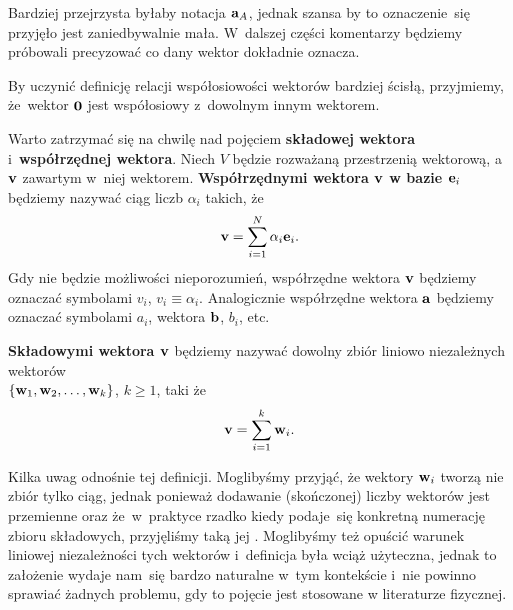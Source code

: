 \documentclass[a4paper,11pt]{article}
\numberwithin{equation}{section}
\begin{document}
Bardziej przejrzysta byłaby notacja $\mathbf{a}_{ A }$, jednak szansa by to
oznaczenie~się przyjęło jest zaniedbywalnie mała. W~dalszej części
komentarzy będziemy próbowali precyzować co dany wektor dokładnie oznacza.

\VerSpaceFour




\noindent
{} By uczynić definicję relacji współosiowości wektorów bardziej
ścisłą, przyjmiemy, że~wektor $\mathbf{0}$ jest współosiowy z~dowolnym
innym wektorem.

\VerSpaceFour





\noindent
{} Warto zatrzymać się na chwilę nad pojęciem \textbf{składowej
  wektora} i~\textbf{współrzędnej wektora}. Niech $V$ będzie rozważaną
przestrzenią wektorową, a~$\mathbf{v}$ zawartym w~niej wektorem.
\textbf{Współrzędnymi wektora $\mathbf{v}$ w bazie $\mathbf{e}_{ i }$}
będziemy nazywać ciąg liczb $\alpha_{ i }$ takich, że
\begin{equation}
  \label{eq:SkalmierskiMechanika-01}
  \mathbf{v} = \sum_{ i = 1 }^{ N } \alpha_{ i } \mathbf{e}_{ i }.
\end{equation}
Gdy nie będzie możliwości nieporozumień, współrzędne wektora $\mathbf{v}$
będziemy oznaczać symbolami $v_{ i }$, $v_{ i } \equiv \alpha_{ i }$. Analogicznie
współrzędne wektora $\mathbf{a}$ będziemy oznaczać symbolami $a_{ i }$,
wektora $\mathbf{b}$, $b_{ i }$, etc.

\textbf{Składowymi wektora $\mathbf{v}$} będziemy nazywać dowolny zbiór
liniowo niezależnych wektorów \\
$\{ \mathbf{w}_{ 1 }, \mathbf{w}_{ 2 }, \ldots, \mathbf{w}_{ k } \}$, $k \geq 1$, taki że
\begin{equation}
  \label{eq:SkalmierskiMechanika-02}
  \mathbf{v} = \sum_{ i = 1 }^{ k } \mathbf{w}_{ i }.
\end{equation}

Kilka uwag odnośnie tej definicji. Moglibyśmy przyjąć, że wektory
$\mathbf{w}_{ i }$ tworzą nie zbiór tylko ciąg, jednak ponieważ dodawanie
(skończonej) liczby wektorów jest przemienne oraz że~w~praktyce rzadko
kiedy podaje~się konkretną numerację zbioru składowych, przyjęliśmy taką
jej . Moglibyśmy też opuścić warunek liniowej niezależności tych
wektorów i~definicja była wciąż użyteczna, jednak to założenie wydaje
nam~się bardzo naturalne w~tym kontekście i~nie powinno sprawiać żadnych
problemu, gdy to pojęcie jest stosowane w literaturze fizycznej.
\end{document}
